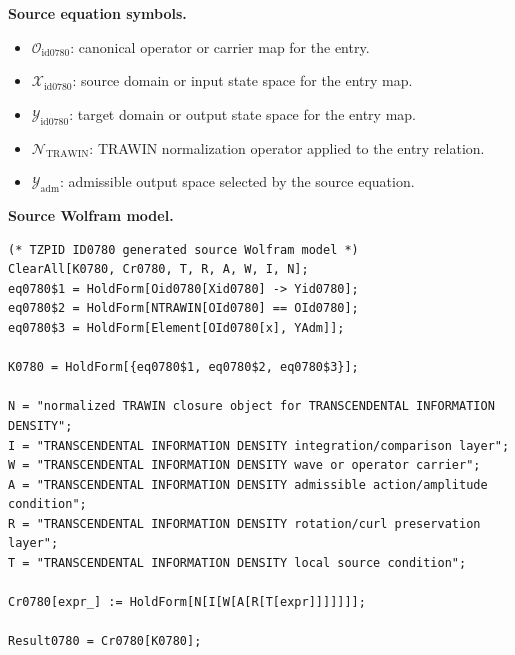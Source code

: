 \begin{minipage}[t]{0.49\linewidth}
\begingroup
\small
\raggedright
\textbf{Source equation symbols.}\par
\begin{itemize}[leftmargin=1.35em,itemsep=1pt,topsep=1pt,parsep=0pt]
    \item $\mathcal{O}_{\mathrm{id0780}}$: canonical operator or carrier map for the entry.
    \item $\mathcal{X}_{\mathrm{id0780}}$: source domain or input state space for the entry map.
    \item $\mathcal{Y}_{\mathrm{id0780}}$: target domain or output state space for the entry map.
    \item $\mathcal{N}_{\mathrm{TRAWIN}}$: TRAWIN normalization operator applied to the entry relation.
    \item $\mathcal{Y}_{\mathrm{adm}}$: admissible output space selected by the source equation.
\end{itemize}
\endgroup
\end{minipage}\hfill
\begin{minipage}[t]{0.47\linewidth}
\begingroup
\scriptsize
\raggedright
\textbf{Source Wolfram model.}\par
\begin{Verbatim}[fontsize=\tiny,breaklines=true,breakanywhere=true]
(* TZPID ID0780 generated source Wolfram model *)
ClearAll[K0780, Cr0780, T, R, A, W, I, N];
eq0780$1 = HoldForm[Oid0780[Xid0780] -> Yid0780];
eq0780$2 = HoldForm[NTRAWIN[OId0780] == OId0780];
eq0780$3 = HoldForm[Element[OId0780[x], YAdm]];

K0780 = HoldForm[{eq0780$1, eq0780$2, eq0780$3}];

N = "normalized TRAWIN closure object for TRANSCENDENTAL INFORMATION DENSITY";
I = "TRANSCENDENTAL INFORMATION DENSITY integration/comparison layer";
W = "TRANSCENDENTAL INFORMATION DENSITY wave or operator carrier";
A = "TRANSCENDENTAL INFORMATION DENSITY admissible action/amplitude condition";
R = "TRANSCENDENTAL INFORMATION DENSITY rotation/curl preservation layer";
T = "TRANSCENDENTAL INFORMATION DENSITY local source condition";

Cr0780[expr_] := HoldForm[N[I[W[A[R[T[expr]]]]]]];

Result0780 = Cr0780[K0780];
\end{Verbatim}
\endgroup
\end{minipage}

